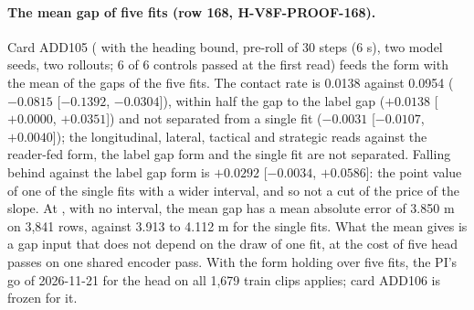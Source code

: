 \paragraph{The mean gap of five fits (row 168, H-V8F-PROOF-168).} Card ADD105 ( with the heading bound, pre-roll of 30 steps (6 s), two model seeds, two rollouts; 6 of 6 controls passed at the first read) feeds the form with the mean of the gaps of the five fits. The contact rate is 0.0138 against 0.0954 ($-0.0815$ [$-0.1392$, $-0.0304$]), within half the gap to the label gap ($+0.0138$ [$+0.0000$, $+0.0351$]) and not separated from a single fit ($-0.0031$ [$-0.0107$, $+0.0040$]); the longitudinal, lateral, tactical and strategic reads against the reader-fed form, the label gap form and the single fit are not separated. Falling behind against the label gap form is $+0.0292$ [$-0.0034$, $+0.0586$]: the point value of one of the single fits with a wider interval, and so not a cut of the price of the slope. At , with no interval, the mean gap has a mean absolute error of 3.850 m on 3,841 rows, against 3.913 to 4.112 m for the single fits. What the mean gives is a gap input that does not depend on the draw of one fit, at the cost of five head passes on one shared encoder pass. With the form holding over five fits, the PI's go of 2026-11-21 for the head on all 1,679 train clips applies; card ADD106 is frozen for it.

